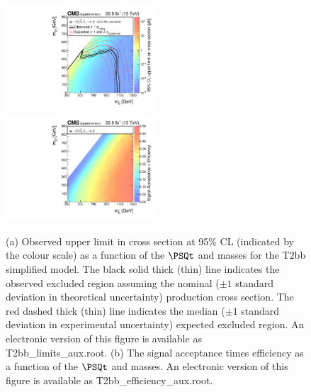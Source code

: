 \begin{figure}
    \begin{center}
            \includegraphics[width=0.50\textwidth]{Supplementary/T2bbXSEC}
            \includegraphics[width=0.50\textwidth]{Supplementary/T2bb_efficiency_aux}
        \caption{ (a) Observed upper limit in cross section at 95\% CL (indicated
        by the colour scale) as a function of 
        the $\PSQt$ and \PSGczDo %
        masses for the 
        T2bb %
        simplified  model.  The  black  solid thick  (thin)  line indicates  the
        observed  excluded  region  assuming   the  nominal  (${\pm}1$  standard
        deviation in theoretical uncertainty)  production cross section. The red
        dashed  thick  (thin)  line  indicates  the  median  (${\pm}1$  standard
        deviation in experimental uncertainty) expected excluded region.
    An electronic version of this figure is available as T2bb\_limits\_aux.root.
        (b) The signal acceptance times efficiency as a function of 
        the $\PSQt$ and \PSGczDo %
        masses.
    An electronic version of this figure is available as T2bb\_efficiency\_aux.root.
        }
        \label{fig:T2bb}
    \end{center}
\end{figure}

